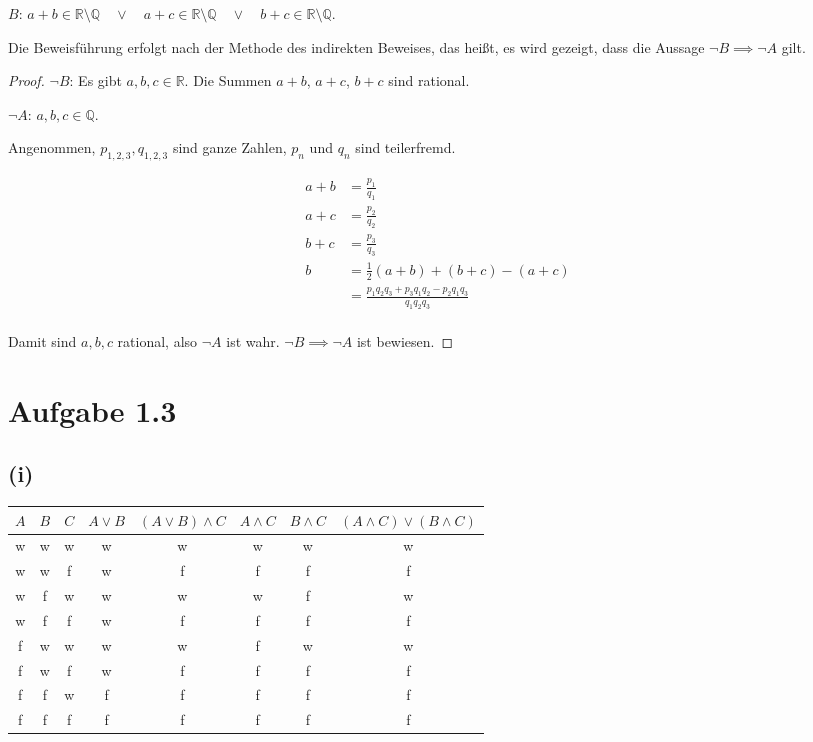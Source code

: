 \documentclass{article}
\begin{document}
\(B\): $a + b  \in \mathbb{R} \setminus \mathbb{Q}
\quad \lor \quad a + c \in \mathbb{R} \setminus \mathbb{Q}
\quad \lor \quad b + c \in \mathbb{R} \setminus \mathbb{Q}$.

  Die Beweisführung erfolgt nach der Methode des indirekten Beweises,
  das heißt, es wird gezeigt, dass die Aussage
  \(\neg B \implies \neg A\) gilt.

\begin{proof}

  \(\neg B\):  Es gibt \(a, b, c \in \mathbb{R}\).  Die Summen \(a+b\),
  \(a+c\), \(b+c\) sind rational.

  \(\neg A\):  \(a, b, c \in \mathbb{Q}\).

  Angenommen, \(p_{1,2,3},q_{1,2,3}\) sind ganze Zahlen, \(p_{n}\) und
  \(q_{n}\) sind teilerfremd.


\begin{align*}
  a+b &= \frac{p_1}{q_1}\\
  a+c &= \frac{p_2}{q_2}\\
  b+c &= \frac{p_3}{q_3}\\
  b&= \frac{1}{2}(a+b)+(b+c)-(a+c)\\
  &=\frac{p_1q_2q_3+p_3q_1q_2-p_2q_1q_3}{q_1q_2q_3}\\
\end{align*}

Damit sind \(a,b,c\) rational, also \(\neg A\) ist wahr.  $\neg B \implies
\neg A$ ist bewiesen.
\end{proof}
\section*{Aufgabe 1.3}
\subsection*{(i)}
\begin{center}
\begin{tabular}{ c  c c c ||c| c c | c|| }
  \(A\) & \(B\) & \(C\) & \(A \lor B\) & \((A \lor B) \wedge C\) & \(A \wedge C\)
  & \(B \wedge C\) & \((A \wedge C) \lor (B \wedge C)\)  \\
  \hline
  w & w & w & w & w & w & w & w \\
  w & w & f & w & f & f & f & f \\
  w & f & w & w & w & w & f & w \\
  w & f & f & w & f & f & f & f \\
  f & w & w & w & w & f & w & w \\
  f & w & f & w & f & f & f & f \\
  f & f & w & f & f & f & f & f \\
  f & f & f & f & f & f & f & f \\
\end{tabular}
\end{center}
\end{document}
